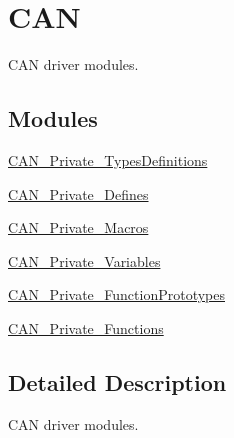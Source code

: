 \hypertarget{group___c_a_n}{\section{C\-A\-N}
\label{group___c_a_n}
}


C\-A\-N driver modules.  


\subsection*{Modules}
\begin{DoxyCompactItemize}
\item 
\hyperlink{group___c_a_n___private___types_definitions}{C\-A\-N\-\_\-\-Private\-\_\-\-Types\-Definitions}
\item 
\hyperlink{group___c_a_n___private___defines}{C\-A\-N\-\_\-\-Private\-\_\-\-Defines}
\item 
\hyperlink{group___c_a_n___private___macros}{C\-A\-N\-\_\-\-Private\-\_\-\-Macros}
\item 
\hyperlink{group___c_a_n___private___variables}{C\-A\-N\-\_\-\-Private\-\_\-\-Variables}
\item 
\hyperlink{group___c_a_n___private___function_prototypes}{C\-A\-N\-\_\-\-Private\-\_\-\-Function\-Prototypes}
\item 
\hyperlink{group___c_a_n___private___functions}{C\-A\-N\-\_\-\-Private\-\_\-\-Functions}
\end{DoxyCompactItemize}


\subsection{Detailed Description}
C\-A\-N driver modules. 